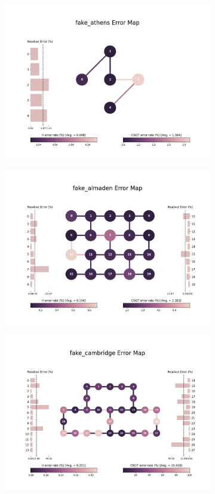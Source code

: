 \documentclass[11pt]{article}
\begin{document}
\begin{figure}[hbtp]
    \begin{subfigure}{0.5\linewidth}
        \centering
        \includegraphics[width=\linewidth]{outputs/errormap_FakeAthensV2.png}
    \end{subfigure}
    \begin{subfigure}{0.5\linewidth}
        \centering
        \includegraphics[width=\linewidth]{outputs/errormap_FakeAlmadenV2.png}
    \end{subfigure}
    \begin{subfigure}{\linewidth}
        \centering
        \includegraphics[width=0.66\linewidth]{outputs/errormap_FakeCambridgeV2.png}

\end{subfigure}
\end{figure}
\end{document}
